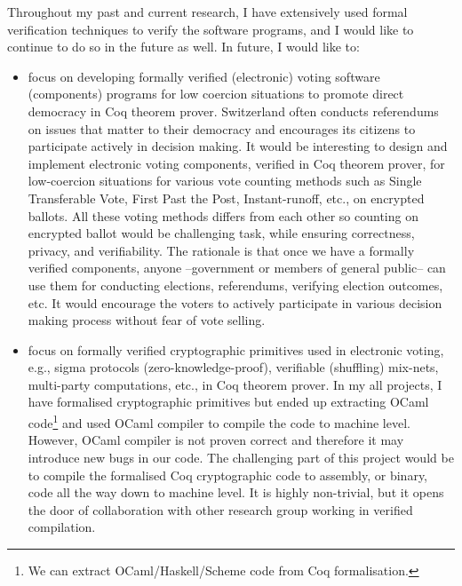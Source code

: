 \documentclass[a4paper]{article}
\begin{document}
Throughout my past and current research, I have extensively used formal verification techniques 
to verify the software programs, and I would like to continue to do so in the future as well. 
In future, I would like to:

\begin{itemize}

\item focus on developing formally verified (electronic) voting software (components) programs 
for low coercion situations to promote direct democracy in Coq theorem prover. Switzerland often 
conducts referendums on issues that matter to their democracy and encourages its citizens 
to participate actively in decision making. It would be interesting to design and 
implement electronic voting components, verified in Coq theorem prover, for low-coercion 
situations for various vote counting methods such as Single Transferable Vote, First Past the Post, 
Instant-runoff, etc., on encrypted ballots. All these voting methods 
differs from each other so counting on encrypted ballot would be challenging task, while 
ensuring correctness, privacy, and verifiability.  
The rationale is that once we have a formally verified components, anyone --government or 
members of general public-- can use them for conducting elections, referendums, 
verifying election outcomes, etc. It would  encourage the voters to 
actively participate in various decision making process without fear of vote selling.

\item focus on formally verified cryptographic primitives used in electronic voting, e.g., 
	sigma protocols (zero-knowledge-proof), verifiable (shuffling) mix-nets, 
	multi-party computations, etc., in Coq theorem prover. 
	In my all projects, I have formalised
	cryptographic primitives but ended up extracting OCaml code\footnote{We can extract OCaml/Haskell/Scheme 
	code from Coq formalisation.} and used OCaml compiler to 
	compile the code to machine level. However, OCaml compiler is not proven correct 
	and therefore it may introduce new bugs in our code. The challenging part of this project would be 
	to compile the formalised Coq cryptographic code to assembly, or binary, code all the way 
	down to machine level. It is highly non-trivial, but it opens the door of 
	collaboration with other research group working in verified compilation.


\end{itemize}
\end{document}
